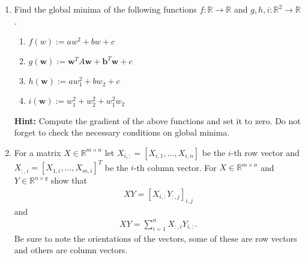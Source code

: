 \documentclass[]{scrartcl}
\newcommand{\R}{\mathbb{R}}
\newcommand{\bb}{\mathbf{b}}
\newcommand{\bw}{\mathbf{w}}
\begin{document}
\begin{enumerate}
\newpage
\item
	Find the global minima of the following functions $f:\mathbb R\rightarrow\mathbb R$ and $g,h,i:\mathbb R^2\rightarrow\mathbb R$. 
	\begin{enumerate}
	\item $f(w):=aw^2+bw+c$
	\item $g(\bw):=\bw^TA\bw+\bb^T\bw+c$
	\item $h(\bw):=aw_1^2+bw_2+c$
	\item $i(\bw):=w_1^2+w_2^2+w_1^2w_2$
	\end{enumerate}
	\textbf{Hint:} Compute the gradient of the above functions and set it to zero. Do not forget to check the necessary conditions on global minima.

\item For a matrix $X \in \R^{m\times n}$ let $X_{i,:} = \left[X_{i,1},\ldots,X_{i,n}  \right]$ be the $i$-th row vector and $X_{:,i} =  \left[X_{1,i}, \ldots , X_{m,i} \right]^T$ be the $i$-th column vector. For $X \in \R^{m\times n}$ and $Y\in \R^{n\times q}$ show that
	\begin{eqnarray*}
		XY = \left[X_{i,:} Y_{:,j} \right]_{i,j}
	\end{eqnarray*}
	and
	\begin{eqnarray*}
		XY = \sum_{i=1}^n X_{:,i} Y_{i,:}.
	\end{eqnarray*}
	Be sure to note the orientations of the vectors, some of these are row vectors and others are column vectors.
\end{enumerate}
\end{document}

